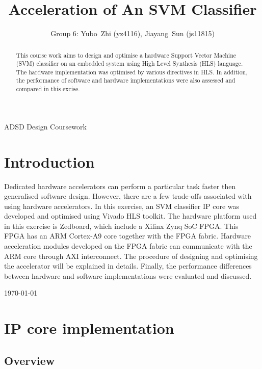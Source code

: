 \documentclass[journal]{IEEEtran}
\begin{document}
\title{Acceleration of An SVM Classifier}

\author{Group 6: Yubo~Zhi (yz4116), Jiayang~Sun (js11815)}

%
{ADSD Design Coursework}

\maketitle

\begin{abstract}
This course work aims to design and optimise a hardware Support Vector Machine (SVM) classifier on an embedded system using High Level Synthesis (HLS) language. The hardware implementation was optimised by various directives in HLS. In addition, the performance of software and hardware implementations were also assessed and compared in this excise.
\end{abstract}

\section{Introduction}

Dedicated hardware accelerators can perform a particular task faster then generalised software design. However, there are a few trade-offs associated with using hardware accelerators. In this exercise, an SVM classifier IP core was developed and optimised using Vivado HLS toolkit. The hardware platform used in this exercise is Zedboard, which include a Xilinx Zynq SoC FPGA. This FPGA has an ARM Cortex-A9 core together with the FPGA fabric. Hardware acceleration modules developed on the FPGA fabric can communicate with the ARM core through AXI interconnect. The procedure of designing and optimising the accelerator will be explained in details. Finally, the performance differences between hardware and software implementations were evaluated and discussed.

\hfill \today

\section{IP core implementation}

\subsection{Overview}
\end{document}
